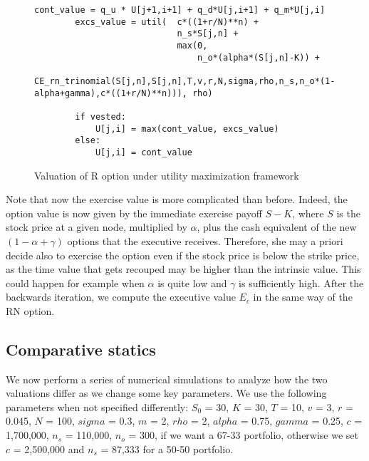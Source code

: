 \begin{figure}[H]
    \begin{lstlisting}[breaklines, basicstyle=\ttfamily\small]
        cont_value = q_u * U[j+1,i+1] + q_d*U[j,i+1] + q_m*U[j,i]
        excs_value = util(  c*((1+r/N)**n) +              
                            n_s*S[j,n] + 
                            max(0, 
                                n_o*(alpha*(S[j,n]-K)) + 
                                CE_rn_trinomial(S[j,n],S[j,n],T,v,r,N,sigma,rho,n_s,n_o*(1-alpha+gamma),c*((1+r/N)**n))), rho)

        if vested:
            U[j,i] = max(cont_value, excs_value)
        else: 
            U[j,i] = cont_value
    \end{lstlisting}
    \caption{Valuation of R option under utility maximization framework}
    \label{fig:ce_exec_r}
\end{figure}



Note that now the exercise value is more complicated than before. Indeed, the option value is now given by the immediate exercise payoff $S-K$, where $S$ is the stock price at a given node, multiplied by $\alpha$, plus the cash equivalent of the new $(1-\alpha+\gamma)$ options that the executive receives. Therefore, she may a priori decide also to exercise the option even if the stock price is below the strike price, as the time value that gets recouped may be higher than the intrinsic value. This could happen for example when $\alpha$ is quite low and $\gamma$ is sufficiently high. 
After the backwards iteration, we compute the executive value $E_c$ in the same way of the RN option.


\subsection{Comparative statics}
We now perform a series of numerical simulations to analyze how the two valuations differ as we change some key parameters.
We use the following parameters when not specified differently: $S_0$ = 30, $K$ = 30, $T$ = 10, $v$ = 3, $r$ = 0.045, $N$ = 100, $sigma$ = 0.3, $m$ = 2, $rho$ = 2, $alpha$ = 0.75, $gamma$ = 0.25, $c$ = 1,700,000, $n_s$ = 110,000, $n_o$ = 300, if we want a 67-33 portfolio, otherwise we set $c$ = 2,500,000 and $n_s$ = 87,333 for a 50-50 portfolio.

\vspace*{30pt}



